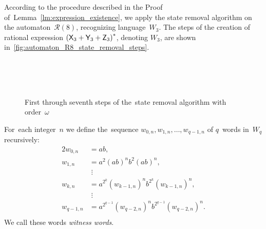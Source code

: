 \begin{example}
    According to the procedure described in the Proof of~Lemma~\ref*{lm:expression_existence}, we apply the state removal algorithm on the automaton~${\mathcal{R}(8)}$, recognizing language~$W_3$. The steps of the creation of rational expression ${({\mathsf{X}}_3 + {\mathsf{Y}}_3 + {\mathsf{Z}}_3)}^*$, denoting $W_3$, are shown in~\autoref*{fig:automaton_R8_state_removal_steps}. 
\end{example}

\begin{figure}%
    \centering
    \hspace{-20pt}%
    \subfloat[][]{\label{fig:automaton_R8_state_removal_steps-a}%
        }%
    \hspace{70pt}%
    \subfloat[][]{\label{fig:automaton_R8_state_removal_steps-b}%
        }\\
    \subfloat[][]{\label{fig:automaton_R8_state_removal_steps-c}%
        }%
    \hspace{8pt}%
    \subfloat[][]{\label{fig:automaton_R8_state_removal_steps-d}%
        }\\
    \subfloat[][]{\label{fig:automaton_R8_state_removal_steps-e}%
        }\\
    \subfloat[][]{\label{fig:automaton_R8_state_removal_steps-f}%
        }%
    \hspace{40pt}%
    \subfloat[][]{\label{fig:automaton_R8_state_removal_steps-g}%
        }%
    \caption{First through seventh steps of the~state removal algorithm with order~$\omega$}\label{fig:automaton_R8_state_removal_steps}%
\end{figure}

\begin{defn}
    For~each integer~$n$ we define the~sequence $w_{0,n}, w_{1,n}, \dotsc , w_{q-1,n}$ of $q$~words in~$W_q$ recursively:
    \begin{alignat*}{2}
        w_{0,n} &= ab,\\
        w_{1,n} &= a^2{(ab)}^{n}b^2{(ab)}^{n},\\
                &\; \vdots \\
        w_{k,n} &= a^{2^k}{(w_{k-1,n})}^{n}b^{2^k}{(w_{k-1,n})}^{n},\\
                &\; \vdots \\
        w_{q-1,n} &= a^{2^{q-1}}{(w_{q-2,n})}^{n}b^{2^{q-1}}{(w_{q-2,n})}^{n}.\\
    \end{alignat*}
    We call these words \emph{witness words}.
\end{defn}

